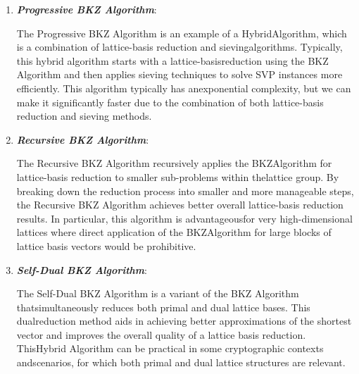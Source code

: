 \documentclass[runningheads]{llncs}
\numberwithin{equation}{section}
\begin{document}
    \begin{enumerate}
        \item \textbf{\textit{Progressive BKZ Algorithm}}:
        \vspace{0.6ex}
    
        The Progressive BKZ Algorithm \cite{gama-nguyen:predicting-lattice-reduction:2008:06-2024,chen-nguyen:bkz-2-better-lattice-security-estimates:2011:06-2024,schnorr-shevchenko:solving-subset-sum-problems-density-close-randomized-bkz-reduction:2012:06-2024,haque-rahman:analyzing-progressive-bkz-lattice-reduction-algorithm:2019:06-2024} is an example of a Hybrid\break Algorithm, which is a combination of lattice-basis reduction and sieving\break algorithms. Typically, this hybrid algorithm starts with a lattice-basis\break reduction using the BKZ Algorithm and then applies sieving techniques to solve SVP instances more efficiently. This algorithm typically has an\break exponential complexity, but we can make it significantly faster due to the combination of both lattice-basis reduction and sieving methods.

        \vspace{2ex}
        \item \textbf{\textit{Recursive BKZ Algorithm}}:
        \vspace{0.6ex}

        The Recursive BKZ Algorithm \cite{chen-nguyen:bkz-2-better-lattice-security-estimates:2011:06-2024,haque-pieprzyk:optimizing-preprocessing-method-recursive-bkz-lattice-reduction-algorithm:2015:06-2024} recursively applies the BKZ\break Algorithm for lattice-basis reduction to smaller sub-problems within the\break lattice group. By breaking down the reduction process into smaller and more manageable steps, the Recursive BKZ Algorithm achieves better overall lattice-basis reduction results. In particular, this algorithm is advantageous\break for very high-dimensional lattices where direct application of the BKZ\break Algorithm for large blocks of lattice basis vectors would be prohibitive.
        
        \vspace{2ex}
        \item \textbf{\textit{Self-Dual BKZ Algorithm}}:
        \vspace{0.6ex}

        The Self-Dual BKZ Algorithm \cite{micciancio-walter:practical-predictable-lattice-basis-reduction:2016:06-2024} is a variant of the BKZ Algorithm that\break simultaneously reduces both primal and dual lattice bases. This dual\break reduction method aids in achieving better approximations of the shortest vector and improves the overall quality of a lattice basis reduction. This\break Hybrid Algorithm can be practical in some cryptographic contexts and\break scenarios, for which both primal and dual lattice structures are relevant.
        

\end{enumerate}
\end{document}
